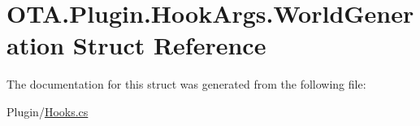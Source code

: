 \hypertarget{struct_o_t_a_1_1_plugin_1_1_hook_args_1_1_world_generation}{}\section{O\+T\+A.\+Plugin.\+Hook\+Args.\+World\+Generation Struct Reference}
\label{struct_o_t_a_1_1_plugin_1_1_hook_args_1_1_world_generation}


The documentation for this struct was generated from the following file\+:\begin{DoxyCompactItemize}
\item 
Plugin/\hyperlink{_hooks_8cs}{Hooks.\+cs}\end{DoxyCompactItemize}
